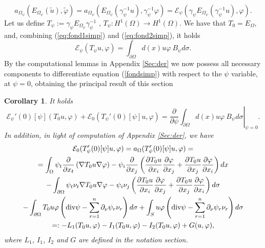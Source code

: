 \documentclass[a4paper,reqno,11pt,oneside]{amsart}
\theoremstyle{plain}
\theoremstyle{plain}
\theoremstyle{plain}
\newtheorem{cor}[thm]{Corollary}
\theoremstyle{remark}
\def\div{\textup{div}}
\begin{document}
\begin{equation}\label{eq:fond2simp}
       a_{\Omega_\psi}(E_{\Omega_\psi}(\tilde u),\tilde \varphi)= 
       a_{\Omega_\psi}( E_{\Omega_\psi}(\gamma_\psi^{-1} u),\gamma_\psi^{-1}  \varphi)
=\mathcal{E}_\psi (\gamma_\psi E_{\Omega_\psi}(\gamma_\psi^{-1} u),\varphi).
\end{equation}
Let us define $T_\psi:= \gamma_\psi E_{\Omega_\psi}\gamma_\psi^{-1} $ , $T_\psi :H^1(\Omega)\rightarrow H^1(\Omega)$. We have that $T_0=E_\Omega $,  and, combining (\ref{eq:fond1simp}) and (\ref{eq:fond2simp}), it holds
\begin{equation}\label{fondsimp}
    \mathcal{E}_\psi (T_\psi u,\varphi)=\int_{\partial \Omega} d(x)u\varphi\ B_\psi d\sigma .
\end{equation} 
By the computational lemmas in Appendix \ref{Sec:der} we now possess all necessary components 
to differentiate equation (\ref{fondsimp}) with respect to the $\psi$ variable, at $\psi=0$, obtaining the principal result of this section
 \begin{cor}
 It holds
 \begin{equation*}
    \mathcal{E}_\psi'(0)[\psi] (T_0 u,\varphi)+
      \mathcal{E}_0 (T_\psi '(0)[\psi] u,\varphi)=\left. \frac{\partial}{\partial \psi}\int_{\partial \Omega}d(x)  u\varphi\ B_\psi d\sigma\right|_{\psi=0}.
\end{equation*} 
In addition, in light of computation of Appendix \ref{Sec:der}, we have
\begin{multline}\label{cond1}
   \mathcal{E}_0 (T_\psi '(0)[\psi] u,\varphi)= a_\Omega  (T_\psi '(0)[\psi] u,\varphi)=\\
   =\int_\Omega\psi_t \frac{\partial}{\partial x_t} \left(\nabla T_0u\nabla \varphi\right) - \psi_i\frac{\partial }{ \partial x_j}\left(\frac{\partial T_0u}{\partial x_i}\frac{\partial \varphi}{\partial x_j}+
\frac{\partial T_0u}{\partial x_j}\frac{\partial \varphi}{\partial x_i}
\right) dx\\ 
-    \int_{\partial\Omega}\psi_t \nu_t \nabla T_0u\nabla \varphi -
\psi_i \nu_j\left(\frac{\partial T_0u}{\partial x_i}\frac{\partial \varphi}{\partial x_j}+\frac{\partial T_0u}{\partial x_j}\frac{\partial \varphi}{\partial x_i}
\right) d\sigma\\
 -   \int_{\partial \Omega} T_0u\varphi \left(\div \psi -\sum_{r=1}^n \partial_\nu \psi_r \nu_r\right) d\sigma+\int_{S}  u\varphi \left(\div \psi -\sum_{r=1}^n \partial_\nu \psi_r \nu_r\right)d\sigma  \\
    =:-L_1( T_0u, \varphi)-
I_1( T_0u, \varphi)
-I_2(T_0 u, \varphi)+G(u,\varphi),
\end{multline}
where $L_1$, $I_1$, $I_2$ and $G$ are defined in the notation section.
\end{cor}
\end{document}
